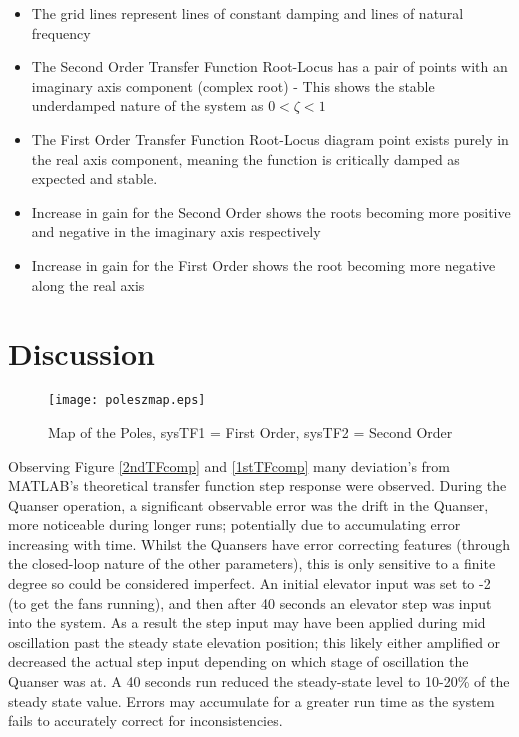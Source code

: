 \begin{itemize}
\tightlist
\item
  The grid lines represent lines of constant damping and lines of
  natural frequency
\item
  The Second Order Transfer Function Root-Locus has a pair of points
  with an imaginary axis component (complex root) - This shows the
  stable underdamped nature of the system as \(0<\zeta<1\)
\item
  The First Order Transfer Function Root-Locus diagram point exists
  purely in the real axis component, meaning the function is critically
  damped as expected and stable.
\item
  Increase in gain for the Second Order shows the roots becoming more
  positive and negative in the imaginary axis respectively
\item
  Increase in gain for the First Order shows the root becoming more
  negative along the real axis
\end{itemize}

\section{Discussion}\label{discussion}

\begin{wrapfigure}{r}{0.56\textwidth}
  \begin{center}
  \vspace{-40pt}
  \texttt{[image: poleszmap.eps]}
  \end{center}
  \caption{Map of the Poles, sysTF1 = First Order, sysTF2 = Second Order}
 \label{poleszmap}
  \vspace{-20pt}
\end{wrapfigure}

Observing Figure \ref{2ndTFcomp} and \ref{1stTFcomp} many deviation's
from MATLAB's theoretical transfer function step response were observed.
During the Quanser operation, a significant observable error was the
drift in the Quanser, more noticeable during longer runs; potentially
due to accumulating error increasing with time. Whilst the Quansers have
error correcting features (through the closed-loop nature of the other
parameters), this is only sensitive to a finite degree so could be
considered imperfect. An initial elevator input was set to -2 (to get
the fans running), and then after 40 seconds an elevator step was input
into the system. As a result the step input may have been applied during
mid oscillation past the steady state elevation position; this likely
either amplified or decreased the actual step input depending on which
stage of oscillation the Quanser was at. A 40 seconds run reduced the
steady-state level to 10-20\% of the steady state value. Errors may
accumulate for a greater run time as the system fails to accurately
correct for inconsistencies.


